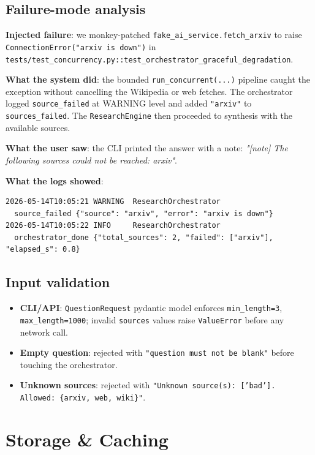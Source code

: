 \documentclass[11pt,a4paper]{article}
\begin{document}
\subsection{Failure-mode analysis}

\textbf{Injected failure}: we monkey-patched \texttt{fake\_ai\_service.fetch\_arxiv} to raise \texttt{ConnectionError("arxiv is down")} in \texttt{tests/test\_concurrency.py::test\_orchestrator\_graceful\_degradation}.

\textbf{What the system did}: the bounded \texttt{run\_concurrent(...)} pipeline caught the exception without cancelling the Wikipedia or web fetches. The orchestrator logged \texttt{source\_failed} at WARNING level and added \texttt{"arxiv"} to \texttt{sources\_failed}. The \texttt{ResearchEngine} then proceeded to synthesis with the available sources.

\textbf{What the user saw}: the CLI printed the answer with a note: \textit{"[note] The following sources could not be reached: arxiv"}.

\textbf{What the logs showed}:
\begin{verbatim}
2026-05-14T10:05:21 WARNING  ResearchOrchestrator
  source_failed {"source": "arxiv", "error": "arxiv is down"}
2026-05-14T10:05:22 INFO     ResearchOrchestrator
  orchestrator_done {"total_sources": 2, "failed": ["arxiv"], "elapsed_s": 0.8}
\end{verbatim}

\subsection{Input validation}

\begin{itemize}
  \item \textbf{CLI/API}: \texttt{QuestionRequest} pydantic model enforces \texttt{min\_length=3}, \texttt{max\_length=1000}; invalid \texttt{sources} values raise \texttt{ValueError} before any network call.
  \item \textbf{Empty question}: rejected with \texttt{"question must not be blank"} before touching the orchestrator.
  \item \textbf{Unknown sources}: rejected with \texttt{"Unknown source(s): ['bad']. Allowed: \{arxiv, web, wiki\}"}.
\end{itemize}

\section{Storage \& Caching}\label{sec:storage}
\end{document}
